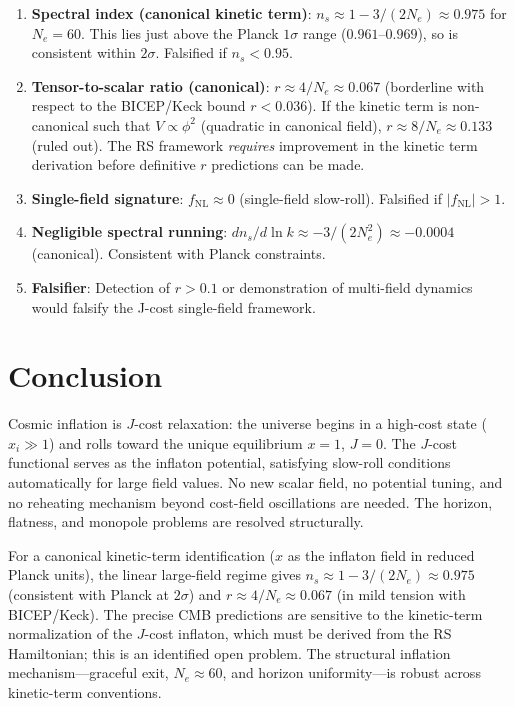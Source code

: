 \documentclass[12pt,a4paper]{article}
\theoremstyle{definition}
\theoremstyle{remark}
\begin{document}
\begin{enumerate}
  \item \textbf{Spectral index (canonical kinetic term)}:
  $n_s \approx 1 - 3/(2N_e) \approx 0.975$ for $N_e = 60$.
  This lies just above the Planck $1\sigma$ range ($0.961$--$0.969$),
  so is consistent within $2\sigma$.  Falsified if $n_s < 0.95$.

  \item \textbf{Tensor-to-scalar ratio (canonical)}:
  $r \approx 4/N_e \approx 0.067$ (borderline with respect to
  the BICEP/Keck bound $r < 0.036$).  If the kinetic term is
  non-canonical such that $V \propto \phi^2$ (quadratic in
  canonical field), $r \approx 8/N_e \approx 0.133$ (ruled out).
  The RS framework \emph{requires} improvement in the kinetic
  term derivation before definitive $r$ predictions can be made.

  \item \textbf{Single-field signature}:
  $f_{\mathrm{NL}} \approx 0$ (single-field slow-roll).
  Falsified if $|f_{\mathrm{NL}}| > 1$.

  \item \textbf{Negligible spectral running}:
  $dn_s/d\ln k \approx -3/(2N_e^2) \approx -0.0004$ (canonical).
  Consistent with Planck constraints.

  \item \textbf{Falsifier}: Detection of $r > 0.1$ or
  demonstration of multi-field dynamics would falsify the
  J-cost single-field framework.
\end{enumerate}

\section{Conclusion}
\label{sec:conclusion}

Cosmic inflation is $J$-cost relaxation: the universe
begins in a high-cost state ($x_i \gg 1$) and rolls
toward the unique equilibrium $x = 1$, $J = 0$.  The
$J$-cost functional serves as the inflaton potential,
satisfying slow-roll conditions automatically for large
field values.  No new scalar field, no potential tuning,
and no reheating mechanism beyond cost-field oscillations
are needed.  The horizon, flatness, and monopole problems
are resolved structurally.

For a canonical kinetic-term identification ($x$ as the
inflaton field in reduced Planck units), the linear
large-field regime gives $n_s \approx 1 - 3/(2N_e)
\approx 0.975$ (consistent with Planck at $2\sigma$) and
$r \approx 4/N_e \approx 0.067$ (in mild tension with
BICEP/Keck).  The precise CMB predictions are sensitive to
the kinetic-term normalization of the $J$-cost inflaton,
which must be derived from the RS Hamiltonian; this is an
identified open problem.  The structural inflation
mechanism---graceful exit, $N_e \approx 60$, and horizon
uniformity---is robust across kinetic-term conventions.
\end{document}
